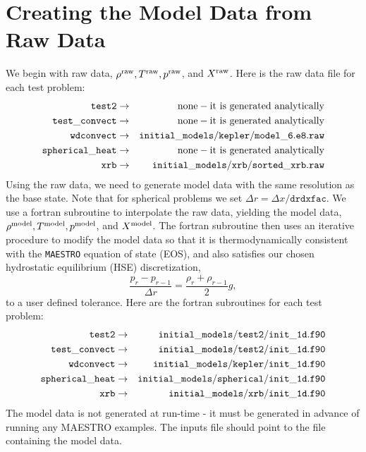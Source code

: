 \section{Creating the Model Data from Raw Data}\label{Sec:Creating the Model Data from Raw Data}
\label{sec:initial_models_main}

We begin with raw data, $\rho^{\rm raw}, T^{\rm raw}, p^{\rm raw}$, and
$X^{\rm raw}$.  Here is the raw data file for each test problem:
\begin{eqnarray}
{\tt test2} & \rightarrow & \mathrm{none-it~ is~ generated~ analytically} \nonumber \nonumber \\
{\tt test\_convect} & \rightarrow & \mathrm{none-it~ is~ generated~ analytically} \nonumber \nonumber \\
{\tt wdconvect} & \rightarrow & {\tt initial\_models/kepler/model\_6.e8.raw} \nonumber \\
{\tt spherical\_heat} & \rightarrow & \mathrm{none-it~ is~ generated~ analytically} \nonumber \\
{\tt xrb} & \rightarrow & {\tt initial\_models/xrb/sorted\_xrb.raw} \nonumber
\end{eqnarray}
Using the raw data, we need to generate model data with the same
resolution as the base state.  Note that for spherical problems we set
$\Delta r = \Delta x/\mathtt{drdxfac}$.  We use a fortran subroutine
to interpolate the raw data, yielding the model data, $\rho^{\rm model},
T^{\rm model}, p^{\rm model}$, and $X^{\rm model}$.  The fortran subroutine
then uses an iterative procedure to modify the model data so that it
is thermodynamically consistent with the {\tt MAESTRO} equation of
state (EOS), and also satisfies our chosen hydrostatic equilibrium
(HSE) discretization,
\begin{equation}
\frac{p_r - p_{r-1}}{\Delta r} = \frac{\rho_r + \rho_{r-1}}{2}g,\label{HSE Discretization}
\end{equation}
to a user defined tolerance.  Here are the fortran subroutines for each test problem:
\begin{eqnarray}
{\tt test2} & \rightarrow & {\tt initial\_models/test2/init\_1d.f90} \nonumber \\
{\tt test\_convect} & \rightarrow & {\tt initial\_models/test2/init\_1d.f90} \nonumber \\
{\tt wdconvect} & \rightarrow & {\tt initial\_models/kepler/init\_1d.f90} \nonumber \\
{\tt spherical\_heat} & \rightarrow & {\tt initial\_models/spherical/init\_1d.f90} \nonumber \\
{\tt xrb} & \rightarrow & {\tt initial\_models/xrb/init\_1d.f90} \nonumber
\end{eqnarray}
The model data is not generated at run-time - it must be generated in
advance of running any MAESTRO examples.  The inputs file should point
to the file containing the model data.

